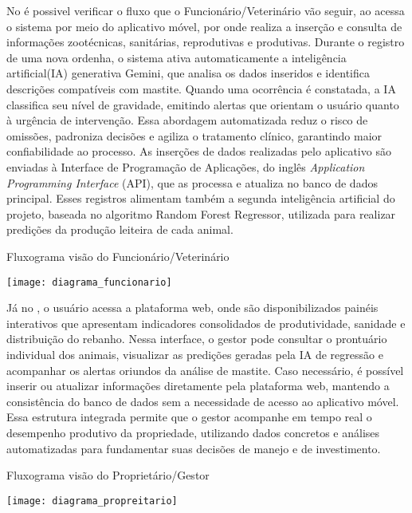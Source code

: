 \newpage

No  é possivel verificar o fluxo que o Funcionário/Veterinário vão seguir, ao acessa o sistema por meio do aplicativo móvel, por onde realiza a inserção e consulta de informações zootécnicas, sanitárias, reprodutivas e produtivas. Durante o registro de uma nova ordenha, o sistema ativa automaticamente a inteligência artificial(IA) generativa Gemini, que analisa os dados inseridos e identifica descrições compatíveis com mastite. Quando uma ocorrência é constatada, a IA classifica seu nível de gravidade, emitindo alertas que orientam o usuário quanto à urgência de intervenção. Essa abordagem automatizada reduz o risco de omissões, padroniza decisões e agiliza o tratamento clínico, garantindo maior confiabilidade ao processo. As inserções de dados realizadas pelo aplicativo são enviadas à Interface de Programação de Aplicações, do inglês \textit{Application Programming Interface} (API), que as processa e atualiza no banco de dados principal. Esses registros alimentam também a segunda inteligência artificial do projeto, baseada no algoritmo Random Forest Regressor, utilizada para realizar predições da produção leiteira de cada animal.

\begin{flowchart}[!htb]
\centering
\caption{Fluxograma visão do Funcionário/Veterinário}%
\label{fcht:fluxograma1}
\texttt{[image: diagrama\_funcionario]}
\end{flowchart}

Já no , o usuário acessa a plataforma web, onde são disponibilizados painéis interativos que apresentam indicadores consolidados de produtividade, sanidade e distribuição do rebanho. Nessa interface, o gestor pode consultar o prontuário individual dos animais, visualizar as predições geradas pela IA de regressão e acompanhar os alertas oriundos da análise de mastite. Caso necessário, é possível inserir ou atualizar informações diretamente pela plataforma web, mantendo a consistência do banco de dados sem a necessidade de acesso ao aplicativo móvel. Essa estrutura integrada permite que o gestor acompanhe em tempo real o desempenho produtivo da propriedade, utilizando dados concretos e análises automatizadas para fundamentar suas decisões de manejo e de investimento.
\newpage
\begin{flowchart}[!htb]
\centering
\caption{Fluxograma visão do Proprietário/Gestor}%
\label{fcht:fluxograma2}
\texttt{[image: diagrama\_propreitario]}
\end{flowchart}

